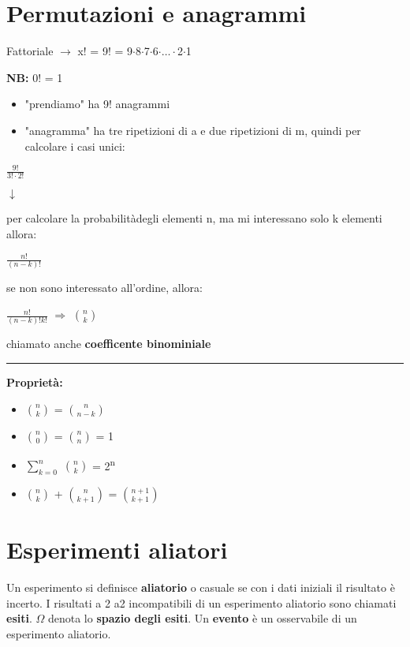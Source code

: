 \documentclass[11pt, letterpaper]{article}
\def\SP#1{\textsuperscript{#1}}
\def\separator{\begin{center}    \rule{100pt}{0.5pt}\end{center}}
\begin{document}
\section{Permutazioni e anagrammi}

Fattoriale $\rightarrow$ x! = 9! = 9$\cdot$8$\cdot$7$\cdot$6$\cdot\dots\cdot$2$\cdot$1

\textbf{NB:} 0! = 1

\begin{itemize}
    \item "prendiamo" ha 9! anagrammi
    \item "anagramma" ha tre ripetizioni di a e due ripetizioni di m, quindi per calcolare i casi unici:   
\end{itemize}
\begin{center}
    \Large $\frac{9!}{3!{\cdot}2!}$ \normalsize

    $\downarrow$
 \end{center} 
per calcolare la probabilitàdegli elementi n, ma mi interessano solo k elementi allora:
\begin{center}
    \Large $\frac{n!}{(n-k)!}$ \normalsize
\end{center}
se non sono interessato all'ordine, allora:
\begin{center}
    \Large $\frac{n!}{(n-k)!k!}$ $\Rightarrow$ $\binom{n}{k}$ \normalsize
\end{center}
chiamato anche \textbf{coefficente binominiale}

\separator

\textbf{Proprietà:}
\begin{itemize}
    \item $\binom{n}{k}$ = $\binom{n}{n-k}$
    \item $\binom{n}{0}$ = $\binom{n}{n}$ = 1
    \item $\sum_{k=0}^{n}$ $\binom{n}{k}$  = 2\SP{n}
    \item $\binom{n}{k}$ + $\binom{n}{k+1}$ = $\binom{n+1}{k+1}$  
\end{itemize}




\section{Esperimenti aliatori}

Un esperimento si definisce \textbf{aliatorio} o casuale se con i dati iniziali il risultato è incerto.
I risultati a 2 a2 incompatibili di un esperimento aliatorio sono chiamati \textbf{esiti}.
$\Omega$ denota lo \textbf{spazio degli esiti}.
Un \textbf{evento} è un osservabile di un esperimento aliatorio.
\end{document}
